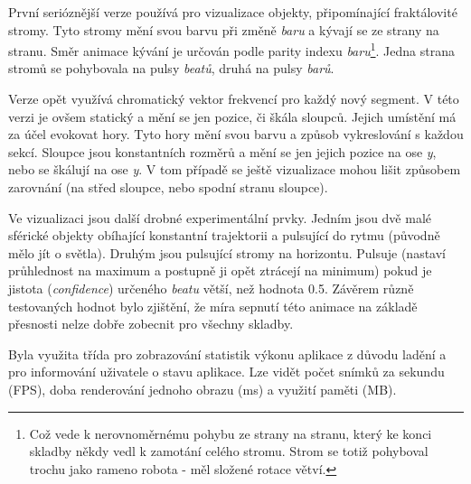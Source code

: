 \documentclass[thesis=B, czech]{FITthesis}[2019/03/06]
\makeatletter
\newenvironment{verze}[6]{ 
    \begin{table}[] 
    \begin{tabular}[t]{@{}ll@{}} 
    \toprule
      \multicolumn{2}{c}{#1}  \\ \midrule
    \multicolumn{2}{c}{          \ \ \ \ \ \ \ \
    \texttt{[image: \#5]}         \ \ \  \ \ \ \ \ 
    }         \\
    verze:            & #2      \\
    technologie:      & #3     \\
    parametry:         & \begin{tabular}[c]{@{}l@{}}#4\end{tabular}       \\ [15pt]
    krátký popis:         & \begin{tabular}[c]{@{}l@{}} #6 \end{tabular}       \\\bottomrule
    \end{tabular}
    \end{table}
    }
\makeatother
\begin{document}
První serióznější verze používá pro vizualizace objekty, připomínající fraktálovité stromy. Tyto stromy mění svou barvu při změně \textit{baru} a kývají se ze strany na stranu. Směr animace kývání je určován podle parity indexu \textit{baru}\footnote{Což vede k nerovnoměrnému pohybu ze strany na stranu, který ke konci skladby někdy vedl k zamotání celého stromu. Strom se totiž pohyboval trochu jako rameno robota - měl složené rotace větví.}. Jedna strana stromů se pohybovala na pulsy \textit{beatů}, druhá na pulsy \textit{barů}. 

Verze opět využívá chromatický vektor frekvencí pro každý nový segment. V této verzi je ovšem statický a mění se jen pozice, či škála sloupců. Jejich umístění má za účel evokovat hory. Tyto hory mění svou barvu a způsob vykreslování s každou sekcí. Sloupce jsou konstantních rozměrů a mění se jen jejich pozice na ose \textit{y}, nebo se škálují na ose \textit{y}. V tom případě se ještě vizualizace mohou lišit způsobem zarovnání (na střed sloupce, nebo spodní stranu sloupce).

Ve vizualizaci jsou další drobné experimentální prvky. Jedním jsou dvě malé sférické objekty obíhající konstantní trajektorii a pulsující do rytmu (původně mělo jít o světla). Druhým jsou pulsující stromy na horizontu. Pulsuje (nastaví průhlednost na maximum a postupně ji opět ztrácejí na minimum) pokud je jistota (\textit{confidence}) určeného \textit{beatu} větší, než hodnota 0.5. Závěrem různě testovaných hodnot bylo zjištění, že míra sepnutí této animace na základě přesnosti nelze dobře zobecnit pro všechny skladby.

Byla využita třída pro zobrazování statistik výkonu aplikace z důvodu ladění a pro informování uživatele o stavu aplikace. Lze vidět počet snímků za sekundu (FPS), doba renderování jednoho obrazu (ms) a využití paměti (MB).






\end{document}
